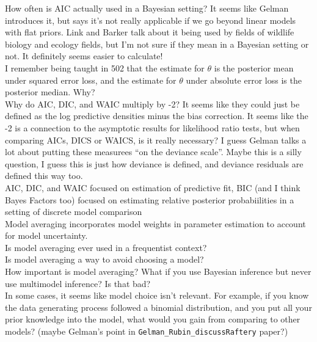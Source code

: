 \documentclass[12pt]{article}\usepackage[]{graphicx}\usepackage[]{color}
\begin{document}
\begin{doublespacing}
\begin{enumerate}
How often is AIC actually used in a Bayesian setting? It seems like Gelman introduces it, but says it's not really applicable if we go beyond linear models with flat priors. Link and Barker talk about it being used by fields of wildlife biology and ecology fields, but I'm not sure if they mean in a Bayesian setting or not. It definitely seems easier to calculate! \\

I remember being taught in 502 that the estimate for $\theta$ is the posterior mean under squared error loss, and the estimate for $\theta$ under absolute error loss is the posterior median. Why? \\

Why do AIC, DIC, and WAIC multiply by -2? It seems like they could just be defined as the log predictive densities minus the bias correction. It seems like the -2 is a connection to the asymptotic results for likelihood ratio tests, but when comparing AICs, DICS or WAICS, is it really necessary? I guess Gelman talks a lot about putting these measurees ``on the deviance scale''. Maybe this is a silly question, I guess this is just how deviance is defined, and deviance residuals are defined this way too. \\

AIC, DIC, and WAIC focused on estimation of predictive fit, BIC (and I think Bayes Factors too) focused on estimating relative posterior probabiilities in a setting of discrete model comparison \\

Model averaging incorporates model weights in parameter estimation to account for model uncertainty. \\

Is model averaging ever used in a frequentist context? \\

Is model averaging a way to avoid choosing a model? \\

How important is model averaging? What if you use Bayesian inference but never use multimodel inference? Is that bad? \\

In some cases, it seems like model choice isn't relevant. For example, if you know the data generating process followed a binomial distribution, and you put all your prior knowledge into the model, what would you gain from comparing to other models? (maybe Gelman's point in \verb+Gelman_Rubin_discussRaftery+ paper?)


\end{enumerate}
\end{doublespacing}
\end{document}
